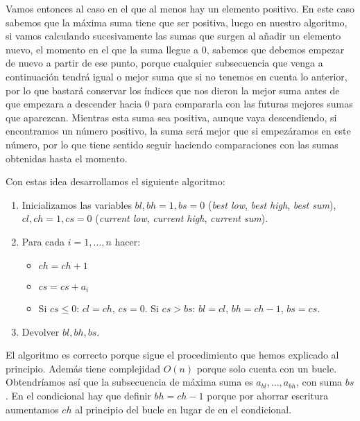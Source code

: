 \documentclass[twoside]{article}
\begin{document}
\begin{solucion}
Vamos entonces al caso en el que al menos hay un elemento positivo. En este caso sabemos que la máxima suma tiene que ser positiva, luego en nuestro algoritmo, si vamos calculando sucesivamente las sumas que surgen al añadir un elemento nuevo, el momento en el que la suma llegue a 0, sabemos que debemos empezar de nuevo a partir de ese punto, porque cualquier subsecuencia que venga a continuación tendrá igual o mejor suma que si no tenemos en cuenta lo anterior, por lo que bastará conservar los índices que nos dieron la mejor suma antes de que empezara a descender hacia 0 para compararla con las futuras mejores sumas que aparezcan. Mientras esta suma sea positiva, aunque vaya descendiendo, si encontramos un número positivo, la suma será mejor que si empezáramos en este número, por lo que tiene sentido seguir haciendo comparaciones con las sumas obtenidas hasta el momento.

Con estas idea desarrollamos el siguiente algoritmo:
\begin{enumerate}
\item Inicializamos las variables $bl, bh=1,bs=0$ (\emph{best low}, \emph{best high}, \emph{best sum}), $cl,ch=1,cs=0$ (\emph{current low}, \emph{current high}, \emph{current sum}). 
\item Para cada $i=1,\dots, n$ hacer:
\begin{itemize}
\item $ch=ch+1$
\item $cs=cs+a_{i}$
\item Si $cs\leq 0$: $cl=ch$, $cs=0$. Si $cs>bs$: $bl=cl$, $bh=ch-1$, $bs=cs$.
\end{itemize}
\item Devolver $bl,bh,bs$. 
\end{enumerate}


El algoritmo es correcto porque sigue el procedimiento que hemos explicado al principio. Además tiene complejidad $O(n)$ porque solo cuenta con un bucle. Obtendríamos así que la subsecuencia de máxima suma es $a_{bl},\dots, a_{bh}$, con suma $bs$. En el condicional hay que definir $bh=ch-1$ porque por ahorrar escritura aumentamos $ch$ al principio del bucle en lugar de en el condicional. 
%

\end{solucion}
\end{document}
